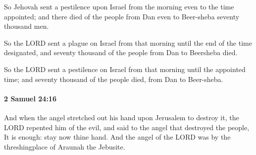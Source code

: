 			\begin{versebox}
					\item[BHS] 
					\item[ASV] So Jehovah sent a pestilence upon Israel from the morning even to the time appointed; and there died of the people from Dan even to Beer-sheba seventy thousand men.
					\item[NIV] So the LORD sent a plague on Israel from that morning until the end of the time designated, and seventy thousand of the people from Dan to Beersheba died.
					\item[NRSV] So the LORD sent a pestilence on Israel from that morning until the appointed time; and seventy thousand of the people died, from Dan to Beer-sheba.
			\end{versebox}

		\paragraph{2 Samuel 24:16} %
			\label{2SAMUEL-24-16}

			And when the angel stretched out his hand upon Jerusalem to destroy it, the LORD repented him of the evil, and said to the angel that destroyed the people, It is enough: stay now thine hand. And the angel of the LORD was by the threshingplace of Araunah the Jebusite.

